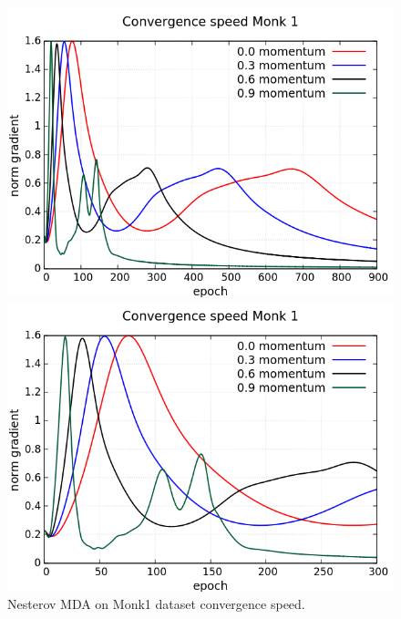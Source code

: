 \begin{figure}[H]
	\centering
	\begin{minipage}[t]{0.5\linewidth}
		\includegraphics[width=\linewidth]{data/MGD/Monk1/NM/Monk1_NMGD_CS_standard.png}
	\end{minipage}%
	\begin{minipage}[t]{0.5\linewidth}
		\includegraphics[width=\linewidth]{data/MGD/Monk1/NM/Monk1_NMGD_CS_zoom.png}
	\end{minipage}
	\caption{Nesterov MDA on Monk1 dataset convergence speed.}
\end{figure}
